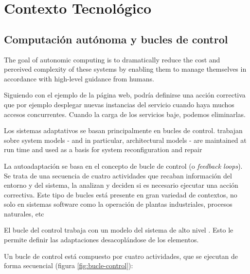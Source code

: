 \chapter{Contexto Tecnológico}
\label{chap:contexto_tecnologico}

\section{Computación autónoma y bucles de control}

The goal of autonomic computing is to dramatically reduce the cost and perceived complexity of these systems by enabling them to manage themselves in accordance with high-level guidance from humans. \cite{ibmcorporationArchitecturalBlueprintAutonomic2006}

Siguiendo con el ejemplo de la página web, podría definirse una acción correctiva que por ejemplo desplegar nuevas instancias del servicio cuando haya muchos accesos concurrentes. Cuando la carga de los servicios baje, podemos eliminarlas.

Los sistemas adaptativos se basan principalmente en bucles de control. trabajan sobre system models - and in particular, architectural models - are maintained at run time
and used as a basis for system reconfiguration and repair \cite{garlanIncreasingSystemDependability2003}

La autoadaptación se basa en el concepto de bucle de control (o \emph{feedback loops}). Se trata de una secuencia de cuatro actividades que recaban información del entorno y del sistema, la analizan y deciden si es necesario ejecutar una acción correctiva.  Este tipo de bucles está presente en gran variedad de contextos, no solo en sistemas software como la operación de plantas industriales, procesos naturales, etc

El bucle del control trabaja con un modelo del sistema de alto nivel \cite{garlanIncreasingSystemDependability2003}. Esto le permite definir las adaptaciones desacoplándose de los elementos.

Un bucle de control está compuesto por cuatro actividades, que se ejecutan de forma secuencial (figura \ref{fig:bucle-control}):


